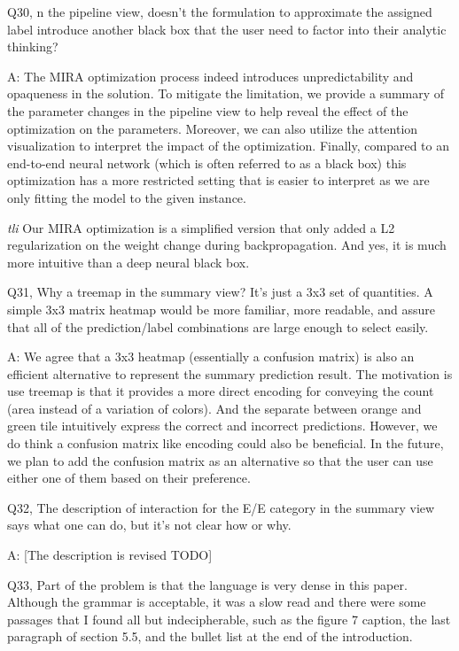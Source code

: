 Q30, n the pipeline view, doesn't the formulation to approximate the assigned label introduce another black box that the user need to factor into their analytic thinking?

A: The MIRA optimization process indeed introduces unpredictability and opaqueness in the solution. To mitigate the limitation, we provide a summary of the parameter changes in the pipeline view to help reveal the effect of the optimization on the parameters. Moreover, we can also utilize the attention visualization to interpret the impact of the optimization. Finally, compared to an end-to-end neural network (which is often referred to as a black box) this optimization has a more restricted setting that is easier to interpret as we are only fitting the model to the given instance.

\emph{tli} Our MIRA optimization is a simplified version that only added a L2 regularization on the weight change during backpropagation. And yes, it is much more intuitive than a deep neural black box.


Q31, Why a treemap in the summary view? It's just a 3x3 set of quantities. A simple 3x3 matrix heatmap would be more familiar, more readable, and assure that all of the prediction/label combinations are large enough to select easily.

A: We agree that a 3x3 heatmap (essentially a confusion matrix) is also an efficient alternative to represent the summary prediction result. The motivation is use treemap is that it provides a more direct encoding for conveying the count (area instead of a variation of colors). And the separate between orange and green tile intuitively express the correct and incorrect predictions. However, we do think a confusion matrix like encoding could also be beneficial. In the future, we plan to add the confusion matrix as an alternative so that the user can use either one of them based on their preference.


Q32, The description of interaction for the E/E category in the summary view says what one can do, but it's not clear how or why.

A: [The description is revised TODO]

Q33, Part of the problem is that the language is very dense in this paper. Although the grammar is acceptable, it was a slow read and there were some passages that I found all but indecipherable, such as the figure 7 caption, the last paragraph of section 5.5, and the bullet list at the end of the introduction.

